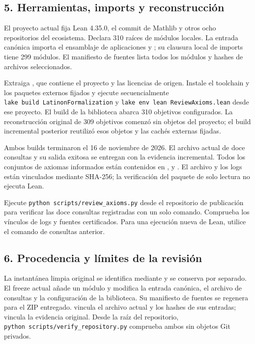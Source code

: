 \documentclass[spanish,11pt,a4paper]{article}
\begin{document}
\subsection{5. Herramientas, imports y reconstrucción}\label{herramientas-imports-y-reconstrucciuxf3n}

El proyecto actual fija Lean 4.35.0, el commit de Mathlib  y otros ocho repositorios del ecosistema. Declara 310 raíces de módulos locales. La entrada canónica  importa el ensamblaje de aplicaciones y ; su clausura local de imports tiene 299 módulos. El manifiesto de fuentes lista todos los módulos y hashes de archivos seleccionados.

Extraiga , que contiene el proyecto  y las licencias de origen. Instale el toolchain y los paquetes externos fijados y ejecute secuencialmente \texttt{lake\ build\ LatinonFormalization} y \texttt{lake\ env\ lean\ ReviewAxioms.lean} desde ese proyecto. El build de la biblioteca abarca 310 objetivos configurados. La reconstrucción original de 309 objetivos comenzó sin objetos del proyecto; el build incremental posterior reutilizó esos objetos y las cachés externas fijadas.

Ambos builds terminaron el 16 de noviembre de 2026. El archivo actual de doce consultas y su salida exitosa se entregan con la evidencia incremental. Todos los conjuntos de axiomas informados están contenidos en ,  y . El archivo y los logs están vinculados mediante SHA-256; la verificación del paquete de solo lectura no ejecuta Lean.

Ejecute \texttt{python\ scripts/review\_axioms.py} desde el repositorio de publicación para verificar las doce consultas registradas con un solo comando. Comprueba los vínculos de logs y fuentes certificados. Para una ejecución nueva de Lean, utilice el comando de consultas anterior.

\subsection{6. Procedencia y límites de la revisión}\label{procedencia-y-luxedmites-de-la-revisiuxf3n}

La instantánea limpia original se identifica mediante  y se conserva por separado. El freeze actual añade un módulo y modifica la entrada canónica, el archivo de consultas y la configuración de la biblioteca. Su manifiesto de fuentes se regenera para el ZIP entregado.  vincula el archivo actual y los hashes de sus entradas;  vincula la evidencia original. Desde la raíz del repositorio, \texttt{python\ scripts/verify\_repository.py} comprueba ambos sin objetos Git privados.
\end{document}
